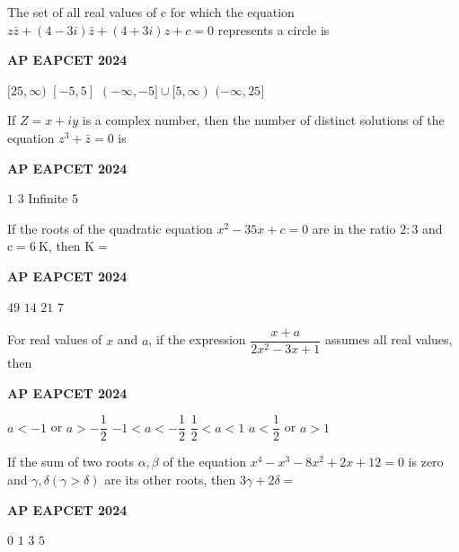 \documentclass[11pt,paper=a4,answers]{exam}
\begin{document}
\begin{multicols}{2}
\begin{questions}
\question
The set of all real values of c for which the equation $z \bar{z}+(4-3 i) \bar{z}+(4+3 i) z+c=0$ represents a circle is
\begin{flushright}
\small\textbf{AP EAPCET 2024}
\end{flushright}
\begin{choices}
  \choice $[25, \infty)$
  \choice $[-5,5]$
  \choice $(-\infty,-5] \cup[5, \infty)$
  \choice $(-\infty, 25]$
\end{choices}



\question

If $Z=x+i y$ is a complex number, then the number of distinct solutions of the equation $z^3+\bar{z}=0$ is

\begin{flushright}
\small\textbf{AP EAPCET 2024}
\end{flushright}
\begin{choices}
  \choice $1$ 
  \choice $3$ 
  \choice Infinite
  \choice $5$ 
\end{choices}



\question
If the roots of the quadratic equation $x^2-35 x+c=0$ are in the ratio $2: 3$ and $\mathrm{c}=6 \mathrm{~K}$, then $\mathrm{K}=$
\begin{flushright}
\small\textbf{AP EAPCET 2024}
\end{flushright}
\begin{choices}
  \choice $49$ 
  \choice $14$ 
  \choice $21$ 
  \choice $7$ 
\end{choices}



\question
For real values of $x$ and $a$, if the expression $\dfrac{x+a}{2 x^2-3 x+1}$ assumes all real values, then
\begin{flushright}
\small\textbf{AP EAPCET 2024}
\end{flushright}
\begin{choices}
  \choice $a<-1$ or $a>-\dfrac{1}{2}$
  \choice $-1<a<-\dfrac{1}{2}$ 
  \choice  $\dfrac{1}{2}<a<1$
  \choice $a<\dfrac{1}{2}$ or $a>1$
\end{choices}



\question
If the sum of two roots $\alpha, \beta$ of the equation $x^4-x^3-8 x^2+2 x+12=0$ is zero and $\gamma, \delta(\gamma>\delta)$ are its other roots, then $3 \gamma+2 \delta=$
\begin{flushright}
\small\textbf{AP EAPCET 2024}
\end{flushright}
\begin{choices}
  \choice $0$ 
  \choice $1$ 
  \choice $3$ 
  \choice $5$ 
\end{choices}


\end{questions}
\end{multicols}
\end{document}
